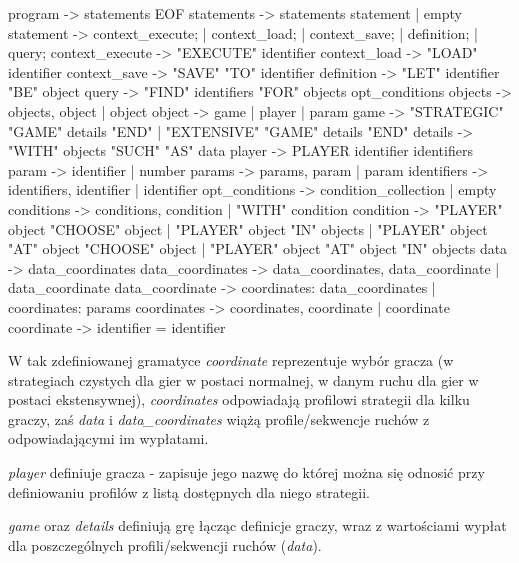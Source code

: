 \documentclass[polish]{standalone}
\begin{document}
\begin{code}[caption=Gramatyka,
             literate={->}{$\rightarrow$}{2}
                      {empty}{$\epsilon$}{1}]
program          -> statements EOF
statements       -> statements statement | empty
statement        -> context_execute; | context_load; |
                    context_save; | definition; | query;
context_execute  -> "EXECUTE" identifier
context_load     -> "LOAD" identifier
context_save     -> "SAVE" "TO" identifier
definition       -> "LET" identifier "BE" object
query            -> "FIND" identifiers
                     "FOR" objects opt_conditions
objects          -> objects, object | object
object           -> game | player | param
game             -> "STRATEGIC" "GAME" details "END" |
                    "EXTENSIVE" "GAME" details "END"
details          -> "WITH" objects "SUCH" "AS" data
player           -> PLAYER identifier { identifiers }
param            -> identifier | number
params           -> params, param | param
identifiers      -> identifiers, identifier |
                    identifier
opt_conditions   -> condition_collection | empty
conditions       -> conditions, condition |
                    "WITH" condition
condition        -> "PLAYER" object "CHOOSE" object |
                    "PLAYER" object "IN" { objects } |
                    "PLAYER" object "AT" object
                                    "CHOOSE" object |
                    "PLAYER" object "AT" object
                                    "IN" { objects }
data             -> data_coordinates
data_coordinates -> data_coordinates, data_coordinate |
                    data_coordinate
data_coordinate  -> { coordinates: data_coordinates } |
                    { coordinates: params }
coordinates      -> coordinates, coordinate |
                    coordinate
coordinate       -> identifier = identifier
\end{code}

W tak zdefiniowanej gramatyce \textit{coordinate} reprezentuje wybór gracza (w strategiach czystych dla gier w postaci
normalnej, w danym ruchu dla gier w postaci ekstensywnej), \textit{coordinates} odpowiadają profilowi strategii dla
kilku graczy, zaś \textit{data} i \textit{data\_coordinates} wiążą profile/sekwencje ruchów z odpowiadającymi im
wypłatami.

\textit{player} definiuje gracza - zapisuje jego nazwę do której można się odnosić przy definiowaniu profilów z listą
dostępnych dla niego strategii.

\textit{game} oraz \textit{details} definiują grę łącząc definicje graczy, wraz z wartościami wypłat dla poszczególnych
profili/sekwencji ruchów (\textit{data}).
\end{document}
